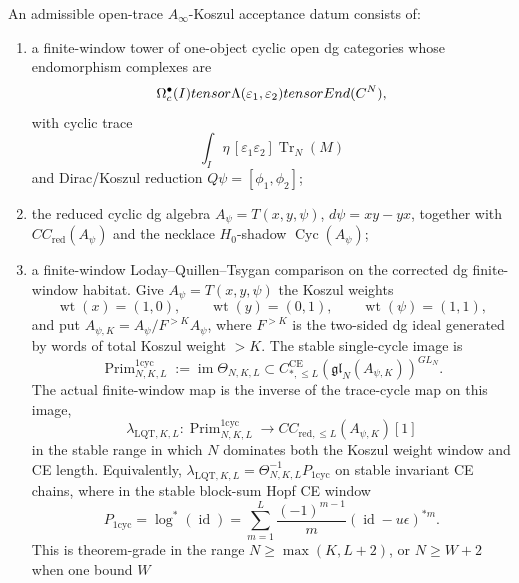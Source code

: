 \begin{defn}\label{defn:stable-ainfty-koszul-acceptance-datum}
  An admissible open-trace \(A_\infty\)-Koszul acceptance datum consists of:
  \begin{enumerate}[label=(K\arabic*)]
    \item a finite-window tower of one-object cyclic open dg categories
      whose endomorphism complexes are
      \[
        \Omega_c^\bullet(I)tensor
        \Lambda(\varepsilon_1,\varepsilon_2)tensor
        End(C^N),
      \]
      with cyclic trace
      \[
        \int_I\eta\,[\varepsilon_1\varepsilon_2]\operatorname{Tr}_N(M)
      \]
      and Dirac/Koszul reduction \(Q\psi=[\phi_1,\phi_2]\);
    \item the reduced cyclic dg algebra
      \(A_\psi=T(x,y,\psi)\), \(d\psi=xy-yx\), together with
      \(CC_{\mathrm{red}}(A_\psi)\) and the necklace
      \(H_0\)-shadow \(\operatorname{Cyc}(A_\psi)\);
    \item a finite-window Loday--Quillen--Tsygan comparison on the
      corrected dg finite-window habitat.  Give
      \(A_\psi=T(x,y,\psi)\) the Koszul weights
      \[
        \operatorname{wt}(x)=(1,0),\qquad
        \operatorname{wt}(y)=(0,1),\qquad
        \operatorname{wt}(\psi)=(1,1),
      \]
      and put
      \(A_{\psi,K}=A_\psi/F^{>K}A_\psi\), where \(F^{>K}\) is the
      two-sided dg ideal generated by words of total Koszul weight
      \(>K\).  The stable single-cycle image is
      \[
        \operatorname{Prim}^{1\mathrm{cyc}}_{N,K,L}
        :=
        \operatorname{im}\Theta_{N,K,L}
        \subset
        C_{*,\le L}^{\mathrm{CE}}(\mathfrak{gl}_N(A_{\psi,K}))^{GL_N}.
      \]
      The actual finite-window map is the inverse of the
      trace-cycle map on this image,
      \[
        \lambda_{\mathrm{LQT},K,L}\colon
        \operatorname{Prim}^{1\mathrm{cyc}}_{N,K,L}
        \longrightarrow
        CC_{\mathrm{red},\le L}(A_{\psi,K})[1]
      \]
      in the stable range in which \(N\) dominates both the Koszul
      weight window and CE length.  Equivalently,
      \(\lambda_{\mathrm{LQT},K,L}
      =\Theta_{N,K,L}^{-1}P_{1\mathrm{cyc}}\)
      on stable invariant CE chains, where in the stable block-sum Hopf
      CE window
      \[
        P_{1\mathrm{cyc}}
        =
        \log^*(\operatorname{id})
        =
        \sum_{m=1}^{L}\frac{(-1)^{m-1}}{m}
        (\operatorname{id}-u\epsilon)^{*m}.
      \]
      This is theorem-grade in the range
      \(N\geq\max(K,L+2)\), or \(N\geq W+2\) when one bound \(W\)

\end{enumerate}
\end{defn}
